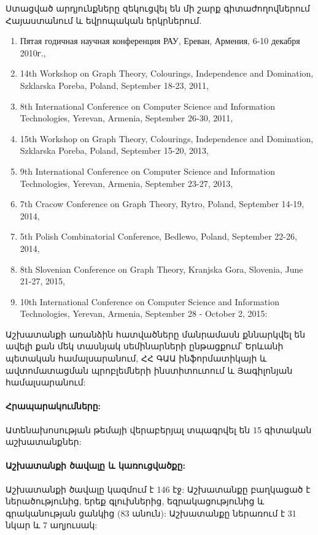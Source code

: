 Ստացված արդյունքները զեկուցվել են մի շարք գիտաժողովներում Հայաստանում և եվրոպական երկրներում.
\begin{enumerate}
\itemsep0em 
\item Пятая годичная научная конференция РАУ, Ереван, Армения, 6-10 декабря 2010г.,
\item 14th Workshop on Graph Theory, Colourings, Independence and Domination, Szklarska Poreba, Poland, September 18-23, 2011,
\item 8th International Conference on Computer Science and Information Technologies, Yerevan, Armenia, September 26-30, 2011,
\item 15th Workshop on Graph Theory, Colourings, Independence and Domination, Szklarska Poreba, Poland, September 15-20, 2013,
\item 9th International Conference on Computer Science and Information Technologies, Yerevan, Armenia, September 23-27, 2013,
\item 7th Cracow Conference on Graph Theory, Rytro, Poland, September 14-19, 2014,
\item 5th Polish Combinatorial Conference, Bedlewo, Poland, September 22-26, 2014,
\item 8th Slovenian Conference on Graph Theory, Kranjska Gora, Slovenia, June 21-27, 2015,
\item 10th International Conference on Computer Science and Information Technologies, Yerevan, Armenia, September 28 - October 2, 2015:
\end{enumerate}

Աշխատանքի առանձին հատվածները մանրամասն քննարկվել են ավելի քան մեկ տասնյակ սեմինարների ընթացքում՝ Երևանի պետական համալսարանում, ՀՀ ԳԱԱ ինֆորմատիկայի և ավտոմատացման պրոբլեմների ինստիտուտում և Յագիլոնյան համալսարանում:

\paragraph{Հրապարակումները:}
Ատենախոսության թեմայի վերաբերյալ տպագրվել են 15 գիտական աշխատանքներ:


\paragraph{Աշխատանքի ծավալը և կառուցվածքը:}
Աշխատանքի ծավալը կազմում է 146 էջ: Աշխատանքը բաղկացած է ներածությունից, երեք գլուխներից, եզրակացությունից և գրականության ցանկից (83 անուն): Աշխատանքը ներառում է 31 նկար և 7 աղյուսակ:



